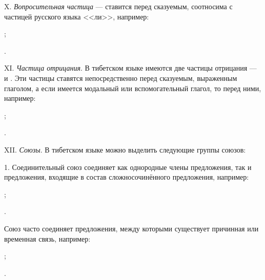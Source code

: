 X. \emph{Вопросительная частица}  --- ставится перед сказуемым, соотносима с частицей русского языка <<ли>>, например:
\begin{prfsample}
	\item {};
	\item {}.
\end{prfsample}

XI. \emph{Частица отрицания}. В тибетском языке имеются две частицы отрицания ---  и . Эти частицы ставятся непосредственно перед сказуемым, выраженным глаголом, а если имеется модальный или вспомогательный глагол, то перед ними, например:
\begin{prfsample}
	\item {};
	\item {}.
\end{prfsample}

XII. \emph{Союзы}. В тибетском языке можно выделить следующие группы союзов:

1. Соединительный союз  соединяет как однородные члены предложения, так и предложения, входящие в состав сложносочинённого предложения, например:
\begin{prfsample}
	\item {};
	\item {}.
\end{prfsample}
Союз  часто соединяет предложения, между которыми существует причинная или временная связь, например:
\begin{prfsample}
	\item {};
	\item {}.
\end{prfsample}

